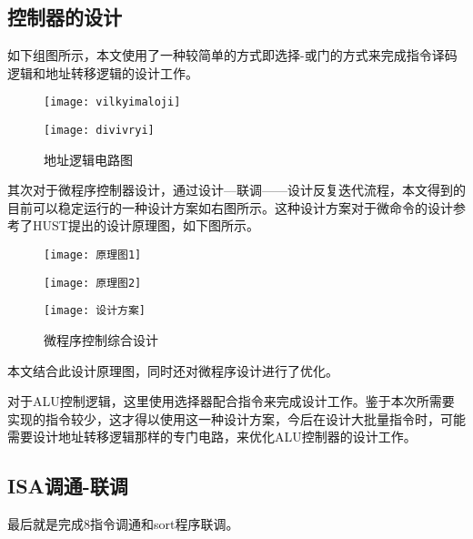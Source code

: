\documentclass[withoutpreface]{cumcmthesis} %
\begin{document}
\subsection{控制器的设计}
如下组图所示，本文使用了一种较简单的方式即选择-或门的方式来完成指令译码逻辑和地址转移逻辑的设计工作。
        \begin{figure}[!htbp]
            \centering
            \begin{minipage}[c]{0.4\textwidth}
                \centering
                \texttt{[image: vilkyimaloji]}
            \end{minipage}
            \begin{minipage}[c]{0.4\textwidth}
                \centering
                \texttt{[image: divivryi]}
            \end{minipage}
            \caption{地址逻辑电路图}
        \end{figure}
其次对于微程序控制器设计，通过设计—联调——设计反复迭代流程，本文得到的目前可以稳定运行的一种设计方案如右图所示。这种设计方案对于微命令的设计参考了HUST提出的设计原理图，如下图所示。
\begin{figure}[!htbp]
    \centering
    \begin{minipage}[c]{0.39\textwidth}
        \centering
        \texttt{[image: 原理图1]}
    \end{minipage}
    \begin{minipage}[c]{0.39\textwidth}
        \centering
        \texttt{[image: 原理图2]}
    \end{minipage}
    \centering
    \begin{minipage}[c]{0.82\textwidth}
        \centering
        \texttt{[image: 设计方案]}
    \end{minipage}
    \caption{微程序控制综合设计}
\end{figure}
本文结合此设计原理图，同时还对微程序设计进行了优化。

对于ALU控制逻辑，这里使用选择器配合指令来完成设计工作。鉴于本次所需要实现的指令较少，这才得以使用这一种设计方案，今后在设计大批量指令时，可能需要设计地址转移逻辑那样的专门电路，来优化ALU控制器的设计工作。
\subsection{ISA调通-联调}
最后就是完成8指令调通和sort程序联调。
\end{document}
